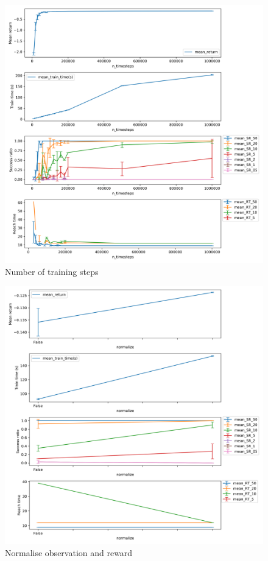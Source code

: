 \documentclass{article}
\begin{document}
\begin{figure}[H]
    \centering
    \includegraphics[width=\textwidth]{../ppo2_n_timesteps.png}
\caption{Number of training steps}
\end{figure}


\begin{figure}[H]
    \centering
    \includegraphics[width=\textwidth]{../ppo2_normalize.png}
\caption{Normalise observation and reward}
\end{figure}
\end{document}
